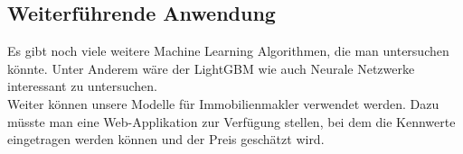 \subsection{Weiterführende Anwendung} 
Es gibt noch viele weitere Machine Learning Algorithmen, die man untersuchen könnte. Unter Anderem wäre der LightGBM wie auch Neurale Netzwerke interessant zu untersuchen.\\ 
Weiter können unsere Modelle für Immobilienmakler verwendet werden. Dazu müsste man eine Web-Applikation zur Verfügung stellen, bei dem die Kennwerte eingetragen werden können und der Preis geschätzt wird. 

